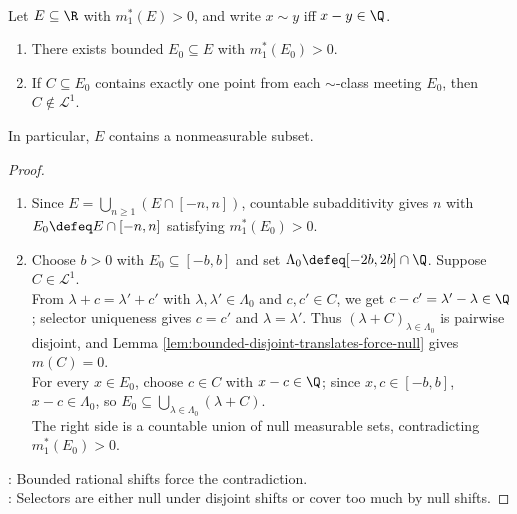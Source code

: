 \begin{proposition} \label{prop:real-line-vitali-choice-set-positive-outer-measure} \\
Let $E\subseteq\R$ with $m_1^\ast(E)>0$, and write $x\sim y$ iff $x-y\in\Q$.
\begin{enumerate}[label=(\roman*)]
\setlength{\itemsep}{0pt}
\item There exists bounded $E_0\subseteq E$ with $m_1^\ast(E_0)>0$.
\item If $C\subseteq E_0$ contains exactly one point from each $\sim$-class meeting $E_0$, then $C\notin\mathcal{L}^1$.
\end{enumerate}
In particular, $E$ contains a nonmeasurable subset.
\begin{proof}
\begin{enumerate}[label=(\roman*)]
\setlength{\itemsep}{0pt}
\item Since $E=\bigcup\limits_{n\geq1}(E\cap[-n,n])$, countable subadditivity gives $n$ with $E_0\defeq E\cap[-n,n]$ satisfying $m_1^\ast(E_0)>0$.
\item Choose $b>0$ with $E_0\subseteq[-b,b]$ and set $\Lambda_0\defeq[-2b,2b]\cap\Q$. Suppose $C\in\mathcal{L}^1$.\\
From $\lambda+c=\lambda'+c'$ with $\lambda,\lambda'\in\Lambda_0$ and $c,c'\in C$, we get $c-c'=\lambda'-\lambda\in\Q$; selector uniqueness gives $c=c'$ and $\lambda=\lambda'$. Thus $(\lambda+C)_{\lambda\in\Lambda_0}$ is pairwise disjoint, and Lemma \ref{lem:bounded-disjoint-translates-force-null} gives $m(C)=0$.\\
For every $x\in E_0$, choose $c\in C$ with $x-c\in\Q$; since $x,c\in[-b,b]$, $x-c\in\Lambda_0$, so $E_0\subseteq\bigcup\limits_{\lambda\in\Lambda_0}(\lambda+C)$.\\
The right side is a countable union of null measurable sets, contradicting $m_1^\ast(E_0)>0$.
\end{enumerate}
: Bounded rational shifts force the contradiction.\\
: Selectors are either null under disjoint shifts or cover too much by null shifts.
\end{proof}
\end{proposition}

